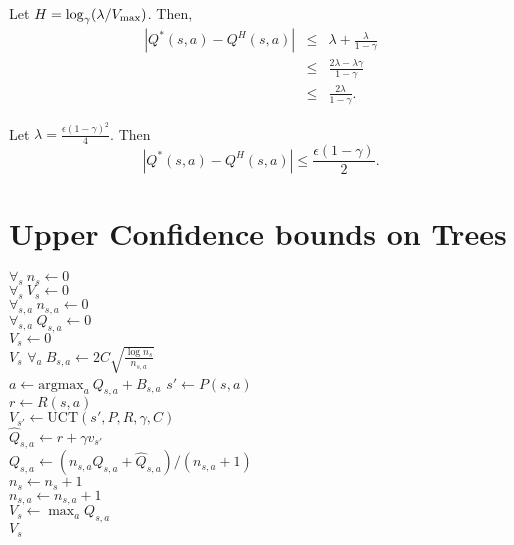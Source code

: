Let $H=\log_{\gamma}(\lambda/V_{\rm max})$. Then,
\begin{eqnarray}
|Q^*(s,a)-Q^H(s,a)|&\leq& \lambda + \frac{\lambda}{1-\gamma}\\
&\leq& \frac{2\lambda-\lambda\gamma}{1-\gamma} \\
&\leq& \frac{2\lambda}{1-\gamma}.
\end{eqnarray}

Let $\lambda = \frac {\epsilon(1-\gamma)^2}{4}$. Then
$$|Q^*(s,a)-Q^H(s,a)| \leq \frac {\epsilon(1-\gamma)}2.$$




\section{Upper Confidence bounds on Trees}

\begin{algorithm}[tb]
	\caption{$\mbox{UCT}(s, P, R, \gamma, C)$}
	\label{alg:uct}
	$\forall_{s} ~ n_{s} \leftarrow 0$\\
	$\forall_{s} ~ V_{s} \leftarrow 0$\\
	$\forall_{s,a} ~ n_{s,a} \leftarrow 0$\\
	$\forall_{s,a} ~ Q_{s,a} \leftarrow 0$\\

	 {
		$V_s \leftarrow 0$\\
		\Return $V_s$
	}
	 {
		$\forall_a ~ B_{s,a} \leftarrow 2 C \sqrt{\frac{\log n_{s}}{n_{s,a}}}$\\
		$a \leftarrow \mbox{argmax}_a ~ Q_{s,a}+B_{s,a}$
	}
	$s' \leftarrow P(s,a)$\\
	$r \leftarrow R(s,a)$\\
	$V_{s'} \leftarrow \mbox{UCT}(s', P, R, \gamma, C)$\\
	$\hat Q_{s,a} \leftarrow r+\gamma v_{s'}$\\
	$Q_{s,a} \leftarrow (n_{s,a}Q_{s,a}+\hat Q_{s,a})/(n_{s,a}+1)$\\
	$n_s \leftarrow n_s+1$\\
	$n_{s,a} \leftarrow n_{s,a}+1$\\
	$V_s \leftarrow \max_a Q_{s,a}$\\
	\Return $V_s$
\end{algorithm}

